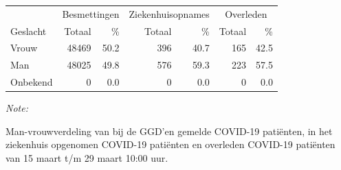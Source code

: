 \documentclass[
  english,
  man,floatsintext]{apa6}
\begin{document}
\begin{table}
\centering\begingroup\fontsize{11}{13}\selectfont

\begin{threeparttable}
\begin{tabular}{lrrrrrr}
\toprule
\multicolumn{1}{c}{ } & \multicolumn{2}{c}{Besmettingen} & \multicolumn{2}{c}{Ziekenhuisopnames} & \multicolumn{2}{c}{Overleden} \\
\cmidrule(l{3pt}r{3pt}){2-3} \cmidrule(l{3pt}r{3pt}){4-5} \cmidrule(l{3pt}r{3pt}){6-7}
Geslacht & Totaal & \% & Totaal & \% & Totaal & \%\\
\midrule
Vrouw & 48469 & 50.2 & 396 & 40.7 & 165 & 42.5\\
Man & 48025 & 49.8 & 576 & 59.3 & 223 & 57.5\\
Onbekend & 0 & 0.0 & 0 & 0.0 & 0 & 0.0\\
\bottomrule
\end{tabular}
\begin{tablenotes}
\item \textit{Note: } 
\item Man-vrouwverdeling van bij de GGD’en gemelde COVID-19 patiënten, in het ziekenhuis opgenomen COVID-19 patiënten en overleden COVID-19 patiënten van 15 maart t/m 29 maart 10:00 uur.
\end{tablenotes}
\end{threeparttable}
\endgroup{}
\end{table}
\newpage
\end{document}
